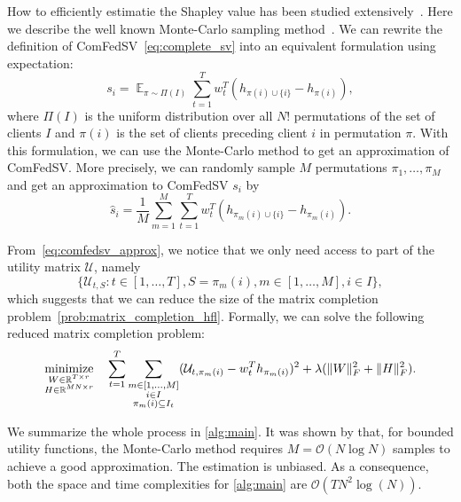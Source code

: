 How to efficiently estimatie the Shapley value has been studied extensively~\citep{ghorbani2019data,jia2019towards}. Here we describe the well known Monte-Carlo sampling method~\citep{metropolis1949monte, ghorbani2019data}. We can rewrite the definition of ComFedSV~\eqref{eq:complete_sv} into an equivalent formulation using expectation:
\begin{equation} 
    s_i = \mathop{\mathbb{E}}_{\pi \sim \Pi(I)} \sum_{t=1}^T w_t^T\left(h_{ \pi(i) \cup \{i\}}  - h_{ \pi(i) }\right),
\end{equation}
where $\Pi(I)$ is the uniform distribution over all $N!$ permutations of the set of clients $I$ and $\pi(i)$ is the set of clients preceding client $i$ in permutation $\pi$. With this formulation, we can use the Monte-Carlo method to get an approximation of ComFedSV. More precisely, we can randomly sample $M$ permutations $\pi_1, \dots, \pi_M$ and get an approximation to ComFedSV $s_i$ by 
\begin{equation} \label{eq:comfedsv_approx}
    \hat s_i = \frac{1}{M}\sum_{m=1}^M \sum_{t=1}^T w_t^T\left(h_{ \pi_m(i) \cup \{i\}}  - h_{ \pi_m(i) }\right).
\end{equation}

From~\eqref{eq:comfedsv_approx}, we notice that we only need access to part of the utility matrix $\mathcal{U}$, namely 
\[ \{\mathcal{U}_{t, S}: t \in [1, \dots, T], S = \pi_m(i), m \in [1,\dots,M], i \in I\}, \]
which suggests that we can reduce the size of the matrix completion problem~\eqref{prob:matrix_completion_hfl}. Formally, we can solve the following reduced matrix completion problem:
\begin{equation}
\label{prob:matrix_completion_reduced}
\displaystyle\mathop{\hbox{\rm minimize}}_{\substack{W \in \mathbb{R}^{T \times r}\\ H \in \mathbb{R}^{MN \times r}}}\enspace\enspace \sum_{t=1}^T\sum_{ \substack{m \in [1,\dots, M] \\ i \in I \\ \pi_m(i) \subseteq I_t  } } (\mathcal{U}_{t,\pi_m(i)} - w_t^Th_{\pi_m(i)})^2 + \lambda(\|W\|_F^2 + \|H\|_F^2).
\end{equation}

We summarize the whole process in \autoref{alg:main}. It was shown by \citet{maleki2013bounding} that, for bounded utility functions, the Monte-Carlo method requires $M = \mathcal{O}(N\log N)$ samples to achieve a good approximation.  The estimation is unbiased. As a consequence, both the space and time complexities for \autoref{alg:main} are $\mathcal{O}(TN^2\log(N))$. 

